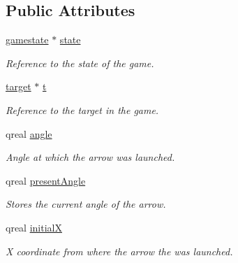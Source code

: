 \subsection*{Public Attributes}
\begin{DoxyCompactItemize}
\item 
\mbox{\label{classarrow_afbf525f81eb33ed7dca870bae3dc7adf}} 
\hyperlink{classgamestate}{gamestate} $\ast$ \hyperlink{classarrow_afbf525f81eb33ed7dca870bae3dc7adf}{state}
\begin{DoxyCompactList}\small\item\em Reference to the state of the game. \end{DoxyCompactList}\item 
\mbox{\label{classarrow_a060b31937403d1059a127e579ff8f0d0}} 
\hyperlink{classtarget}{target} $\ast$ \hyperlink{classarrow_a060b31937403d1059a127e579ff8f0d0}{t}
\begin{DoxyCompactList}\small\item\em Reference to the target in the game. \end{DoxyCompactList}\item 
\mbox{\label{classarrow_aa84c13c4959f9481a6101a79067e9899}} 
qreal \hyperlink{classarrow_aa84c13c4959f9481a6101a79067e9899}{angle}
\begin{DoxyCompactList}\small\item\em Angle at which the arrow was launched. \end{DoxyCompactList}\item 
\mbox{\label{classarrow_a923436fb052435dc61bdefa72cef8a62}} 
qreal \hyperlink{classarrow_a923436fb052435dc61bdefa72cef8a62}{present\+Angle}
\begin{DoxyCompactList}\small\item\em Stores the current angle of the arrow. \end{DoxyCompactList}\item 
\mbox{\label{classarrow_adc3a32bcf6bf8c9d4ec8abe5398cfc4e}} 
qreal \hyperlink{classarrow_adc3a32bcf6bf8c9d4ec8abe5398cfc4e}{initialX}
\begin{DoxyCompactList}\small\item\em X coordinate from where the arrow the was launched. \end{DoxyCompactList}\item 

\end{DoxyCompactItemize}
